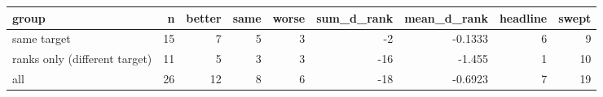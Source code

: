 \begin{tabular}{lrrrrrrrr}
\toprule
group & n & better & same & worse & sum\_d\_rank & mean\_d\_rank & headline & swept \\
\midrule
same target & 15 & 7 & 5 & 3 & -2 & -0.1333 & 6 & 9 \\
ranks only (different target) & 11 & 5 & 3 & 3 & -16 & -1.455 & 1 & 10 \\
all & 26 & 12 & 8 & 6 & -18 & -0.6923 & 7 & 19 \\
\bottomrule
\end{tabular}
